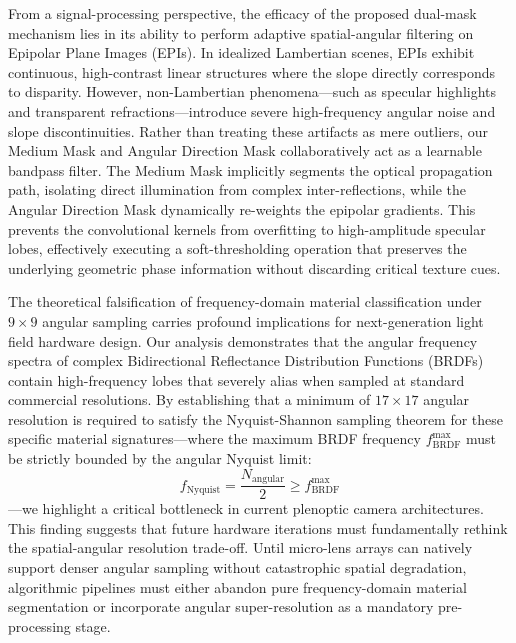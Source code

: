 \documentclass[lettersize,journal]{IEEEtran}
\begin{document}
From a signal-processing perspective, the efficacy of the proposed dual-mask mechanism lies in its ability to perform adaptive spatial-angular filtering on Epipolar Plane Images (EPIs). In idealized Lambertian scenes, EPIs exhibit continuous, high-contrast linear structures where the slope directly corresponds to disparity. However, non-Lambertian phenomena—such as specular highlights and transparent refractions—introduce severe high-frequency angular noise and slope discontinuities. Rather than treating these artifacts as mere outliers, our Medium Mask and Angular Direction Mask collaboratively act as a learnable bandpass filter. The Medium Mask implicitly segments the optical propagation path, isolating direct illumination from complex inter-reflections, while the Angular Direction Mask dynamically re-weights the epipolar gradients. This prevents the convolutional kernels from overfitting to high-amplitude specular lobes, effectively executing a soft-thresholding operation that preserves the underlying geometric phase information without discarding critical texture cues.

The theoretical falsification of frequency-domain material classification under $9 \times 9$ angular sampling carries profound implications for next-generation light field hardware design. Our analysis demonstrates that the angular frequency spectra of complex Bidirectional Reflectance Distribution Functions (BRDFs) contain high-frequency lobes that severely alias when sampled at standard commercial resolutions. By establishing that a minimum of $17 \times 17$ angular resolution is required to satisfy the Nyquist-Shannon sampling theorem for these specific material signatures—where the maximum BRDF frequency $f_{\text{BRDF}}^{\text{max}}$ must be strictly bounded by the angular Nyquist limit:
\begin{equation}
\label{eq:eq15}
f_{\text{Nyquist}} = \frac{N_{\text{angular}}}{2} \geq f_{\text{BRDF}}^{\text{max}}
\end{equation}
—we highlight a critical bottleneck in current plenoptic camera architectures. This finding suggests that future hardware iterations must fundamentally rethink the spatial-angular resolution trade-off. Until micro-lens arrays can natively support denser angular sampling without catastrophic spatial degradation, algorithmic pipelines must either abandon pure frequency-domain material segmentation or incorporate angular super-resolution as a mandatory pre-processing stage.
\end{document}

